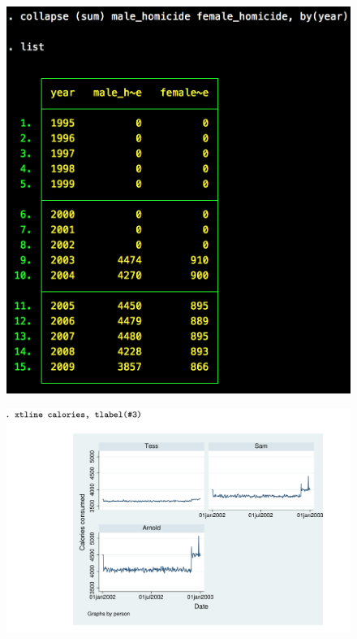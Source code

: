 \documentclass[notes=show]{beamer}
\begin{document}
\begin{frame}[plain]

\begin{figure}
\centering
\includegraphics[scale=0.25]{./lecture_includes/collapse.png}
\end{figure}

\end{frame}



\begin{frame}[plain]

\begin{figure}
\centering
\includegraphics[scale=0.1]{./lecture_includes/panel_calories.png}
\end{figure}

\end{frame}
\end{document}
